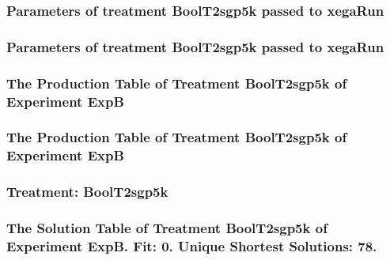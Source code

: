 \documentclass[18pt,c]{beamer}
\begin{document}

 \begin{frame}
 \fontsize{8pt}{9pt}\selectfont
 \frametitle{  Parameters of treatment BoolT2sgp5k passed to xegaRun
 }

 \label{ExpBtParmTable054.tex}  
 \end{frame}


 \begin{frame}
 \fontsize{8pt}{9pt}\selectfont
 \frametitle{  Parameters of treatment BoolT2sgp5k passed to xegaRun
 }

 \label{ExpBtParmTable055.tex}  
 \end{frame}

 \begin{frame}
 \fontsize{8pt}{9pt}\selectfont
 \frametitle{ The Production Table of Treatment BoolT2sgp5k of Experiment ExpB }

 \label{ExpBGrammarTable014.tex}  
 \end{frame}

 \begin{frame}
 \fontsize{8pt}{9pt}\selectfont
 \frametitle{ The Production Table of Treatment BoolT2sgp5k of Experiment ExpB }

 \label{ExpBGrammarTable015.tex}  
 \end{frame}

 \begin{frame}
 \fontsize{8pt}{9pt}\selectfont
 \frametitle{ Treatment: BoolT2sgp5k }

 \label{ExpBStatsTable020.tex}  
 \end{frame}

 \begin{frame}
 \fontsize{8pt}{9pt}\selectfont
 \frametitle{ The Solution Table of Treatment BoolT2sgp5k of Experiment ExpB. Fit: 0. Unique Shortest Solutions: 78. }

 \label{ExpBSolutionTable013.tex}  
 \end{frame}
\end{document}

